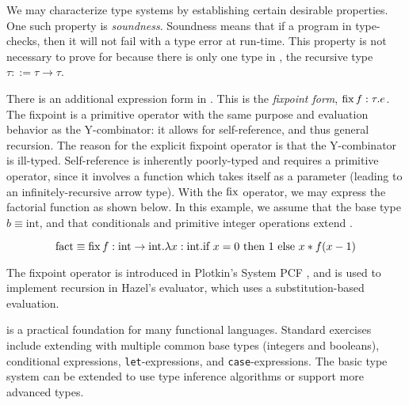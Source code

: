 \begin{singlespace}
\end{singlespace}

We may characterize type systems by establishing certain desirable properties. One such property is \textit{soundness}. Soundness means that if a program in \stlc{} type-checks, then it will not fail with a type error at run-time. This property is not necessary to prove for \ulc{} because there is only one type in \ulc{}, the recursive type $\tau::=\tau\to\tau$.

There is an additional expression form in \stlc{}. This is the \textit{fixpoint form}, $\operatorname{fix} f:\tau.e$. The fixpoint is a primitive operator with the same purpose and evaluation behavior as the Y-combinator: it allows for self-reference, and thus general recursion. The reason for the explicit fixpoint operator is that the Y-combinator is ill-typed. Self-reference is inherently poorly-typed and requires a primitive operator, since it involves a function which takes itself as a parameter (leading to an infinitely-recursive arrow type). With the $\operatorname{fix}$ operator, we may express the factorial function as shown below. In this example, we assume that the base type $b\equiv\text{int}$, and that conditionals and primitive integer operations extend \stlc{}.

\begin{equation*}
  \text{fact}\equiv\operatorname{fix} f:\text{int}\to \text{int}.\lambda x:\text{int}.\text{if }x=0\text{ then }1\text{ else }x*f(x-1)
\end{equation*}

The fixpoint operator is introduced in Plotkin's System PCF , and is used to implement recursion in Hazel's evaluator, which uses a substitution-based evaluation.

\stlc{} is a practical foundation for many functional languages. Standard exercises include extending \stlc{} with multiple common base types (integers and booleans), conditional expressions, \texttt{let}-expressions, and \texttt{case}-expressions. The basic type system can be extended to use type inference algorithms or support more advanced types.

